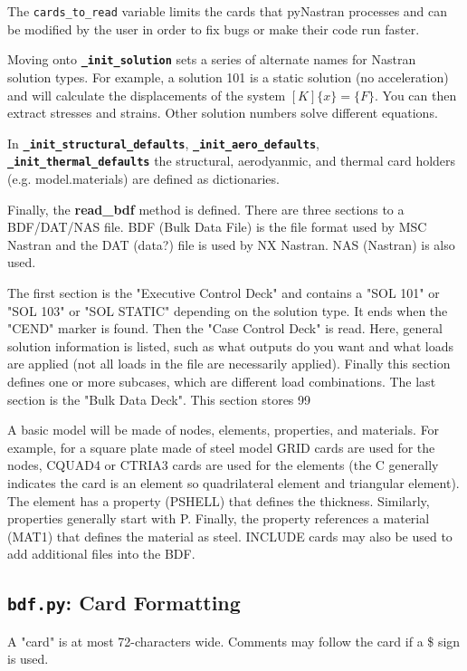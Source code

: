      The {\tt cards_to_read} variable limits the cards that pyNastran processes and can be modified by the user in order to fix bugs or make their code run faster.

     Moving onto {\bf \tt \_init\_solution} sets a series of alternate names for Nastran solution types.  For example, a solution 101 is a static solution (no acceleration) and will calculate the displacements of the system $[K]\{x\} = \{F\} $.  You can then extract stresses and strains.  Other solution numbers solve different equations.

     In {\bf \tt \_init\_structural\_defaults}, {\bf \tt \_init\_aero\_defaults}, {\bf \tt \_init\_thermal\_defaults} the structural, aerodyanmic, and thermal card holders (e.g. model.materials) are defined as dictionaries.

     Finally, the {\bf read_bdf} method is defined.  There are three sections to a BDF/DAT/NAS file.  BDF (Bulk Data File) is the file format used by MSC Nastran and the DAT (data?) file is used by NX Nastran.  NAS (Nastran) is also used.

     The first section is the "Executive Control Deck" and contains a "SOL 101" or "SOL 103" or "SOL STATIC" depending on the solution type.  It ends when the "CEND" marker is found. Then the "Case Control Deck" is read.  Here, general solution information is listed, such  as what outputs do you want and what loads are applied (not all loads in the file are necessarily applied).  Finally this section defines one or more subcases, which are different load combinations.  The last section is the "Bulk Data Deck".  This section stores 99%

     A basic model will be made of nodes, elements, properties, and materials.  For example, for a square plate made of steel model GRID cards are used for the nodes, CQUAD4 or CTRIA3 cards are used for the elements (the C generally indicates the card is an element so quadrilateral element and triangular element).  The element has a property (PSHELL) that defines the thickness.  Similarly, properties generally start with P.  Finally,  the property references a material (MAT1) that defines the material as steel.  INCLUDE cards may also be used to add additional files into the BDF.

 \subsection{{\tt bdf.py}: Card Formatting}
     A "card" is at most 72-characters wide.  Comments may follow the card if a \$ sign is used.

